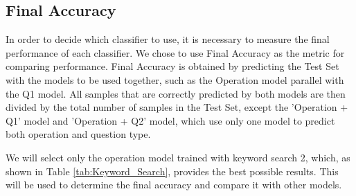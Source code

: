 \documentclass[12pt,oneside,openright,a4paper]{cpe-english-project}
\begin{document}
    \subsection{Final Accuracy}
      \qquad In order to decide which classifier to use, it is necessary to measure the final performance of each classifier. We chose to use Final Accuracy as the metric for comparing performance. Final Accuracy is obtained by predicting the Test Set with the models to be used together, such as the Operation model parallel with the Q1 model. All samples that are correctly predicted by both models are then divided by the total number of samples in the Test Set, except the 'Operation + Q1' model and 'Operation + Q2' model, which use only one model to predict both operation and question type. \par
      \qquad We will select only the operation model trained with keyword search 2, which, as shown in Table \ref{tab:Keyword_Search}, provides the best possible results. This will be used to determine the final accuracy and compare it with other models. \par
\end{document}
